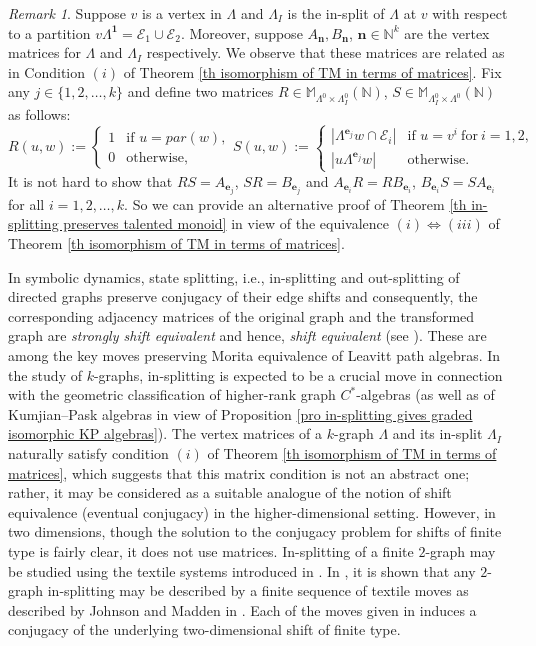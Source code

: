 \documentclass[12pt]{amsart}
\newcommand{\N}{\mathbf{n}}
\theoremstyle{definition}
\theoremstyle{remark}
\newtheorem{rmk}[thm]{Remark}
\begin{document}
\begin{rmk}\label{rem matrix connection of in-splitting}
Suppose $v$ is a vertex in $\Lambda$ and $\Lambda_I$ is the in-split of $\Lambda$ at $v$ with respect to a partition $v\Lambda^\mathbf{1}=\mathcal{E}_1\cup \mathcal{E}_2$. Moreover, suppose $A_\N,B_\N$, $\N\in \mathbb{N}^k$ are the vertex matrices for $\Lambda$ and $\Lambda_I$ respectively. We observe that these matrices are related as in Condition $(i)$ of Theorem \ref{th isomorphism of TM in terms of matrices}. Fix any $j\in \{1,2,\ldots,k\}$ and define two matrices $R\in \mathbb{M}_{\Lambda^0\times \Lambda_I^0}(\mathbb{N})$, $S\in \mathbb{M}_{\Lambda_I^0\times \Lambda^0}(\mathbb{N})$ as follows: \[R(u,w):=
	\left\{
	\begin{array}{ll}
		1  & \mbox{if } u=par(w), \\
		0  & \mbox{otherwise,} 
	\end{array}
	\right. S(u,w):=
	\left\{
	\begin{array}{ll}
		|\Lambda^{\mathbf{e}_j}w\cap \mathcal{E}_i|  & \mbox{if } u=v^i~\text{for}~i=1,2, \\
		|u\Lambda^{\mathbf{e}_j}w|  & \mbox{otherwise. }
	\end{array}
	\right.\]
It is not hard to show that $RS=A_{\mathbf{e}_j}$, $SR=B_{\mathbf{e}_j}$ and $A_{\mathbf{e}_i}R=RB_{\mathbf{e}_i}$, $B_{\mathbf{e}_i}S=SA_{\mathbf{e}_i}$ for all $i=1,2,\ldots,k$. So we can provide an alternative proof of Theorem \ref{th in-splitting preserves talented monoid} in view of the equivalence $(i)\Longleftrightarrow (iii)$ of Theorem \ref{th isomorphism of TM in terms of matrices}. 

In symbolic dynamics, state splitting, i.e., in-splitting and out-splitting of directed graphs preserve conjugacy of their edge shifts and consequently, the corresponding adjacency matrices of the original graph and the transformed graph are \emph{strongly shift equivalent} and hence, \emph{shift equivalent} (see \cite[Theorems 7.2.7 and 7.3.3]{Lind-Marcus}). These are among the key moves preserving Morita equivalence of Leavitt path algebras. In the study of $k$-graphs, in-splitting is expected to be a crucial move in connection with the geometric classification of higher-rank graph $C^*$-algebras (as well as of Kumjian--Pask algebras in view of Proposition \ref{pro in-splitting gives graded isomorphic KP algebras}). The vertex matrices of a $k$-graph $\Lambda$ and its in-split $\Lambda_I$ naturally satisfy condition $(i)$ of Theorem \ref{th isomorphism of TM in terms of matrices}, which suggests that this matrix condition is not an abstract one; rather, it may be considered as a suitable analogue of the notion of shift equivalence (eventual conjugacy) in the higher-dimensional setting. However, in two dimensions, though the solution to the conjugacy problem for shifts of finite type is fairly clear, it does not use matrices. In-splitting of a finite $2$-graph may be studied using the textile systems introduced in \cite{Nasu}. In \cite{WoA}, it is shown that any $2$-graph in-splitting may be described by a finite sequence of textile moves as described by Johnson and Madden in \cite{JM}. Each of the moves given in \cite{JM} induces a conjugacy of the underlying two-dimensional shift of finite type. 


\end{rmk}
\end{document}
